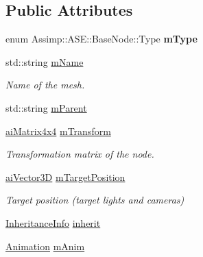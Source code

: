 \subsection*{Public Attributes}
\begin{DoxyCompactItemize}
\item 
\hypertarget{struct_assimp_1_1_a_s_e_1_1_base_node_acd7f2fd60c9259dc3c278f4c6e708300}{enum Assimp\+::\+A\+S\+E\+::\+Base\+Node\+::\+Type {\bfseries m\+Type}}\label{struct_assimp_1_1_a_s_e_1_1_base_node_acd7f2fd60c9259dc3c278f4c6e708300}

\item 
\hypertarget{struct_assimp_1_1_a_s_e_1_1_base_node_a1ee5b846983351d3dfc682df4fbc1807}{std\+::string \hyperlink{struct_assimp_1_1_a_s_e_1_1_base_node_a1ee5b846983351d3dfc682df4fbc1807}{m\+Name}}\label{struct_assimp_1_1_a_s_e_1_1_base_node_a1ee5b846983351d3dfc682df4fbc1807}

\begin{DoxyCompactList}\small\item\em Name of the mesh. \end{DoxyCompactList}\item 
std\+::string \hyperlink{struct_assimp_1_1_a_s_e_1_1_base_node_a65c3ff02a4f7a4f7548dbab107b0e026}{m\+Parent}
\item 
\hypertarget{struct_assimp_1_1_a_s_e_1_1_base_node_a84de0c31678f49a7242b25b2f0b3556c}{\hyperlink{structai_matrix4x4}{ai\+Matrix4x4} \hyperlink{struct_assimp_1_1_a_s_e_1_1_base_node_a84de0c31678f49a7242b25b2f0b3556c}{m\+Transform}}\label{struct_assimp_1_1_a_s_e_1_1_base_node_a84de0c31678f49a7242b25b2f0b3556c}

\begin{DoxyCompactList}\small\item\em Transformation matrix of the node. \end{DoxyCompactList}\item 
\hypertarget{struct_assimp_1_1_a_s_e_1_1_base_node_a8d6ca90c2c2a985a295cab16a6770ed6}{\hyperlink{structai_vector3_d}{ai\+Vector3\+D} \hyperlink{struct_assimp_1_1_a_s_e_1_1_base_node_a8d6ca90c2c2a985a295cab16a6770ed6}{m\+Target\+Position}}\label{struct_assimp_1_1_a_s_e_1_1_base_node_a8d6ca90c2c2a985a295cab16a6770ed6}

\begin{DoxyCompactList}\small\item\em Target position (target lights and cameras) \end{DoxyCompactList}\item 
\hyperlink{struct_assimp_1_1_a_s_e_1_1_inheritance_info}{Inheritance\+Info} \hyperlink{struct_assimp_1_1_a_s_e_1_1_base_node_a3ba9514175a7012d01f182d4150bf136}{inherit}
\item 
\hypertarget{struct_assimp_1_1_a_s_e_1_1_base_node_a7f1c087a6e0791a7b25c77c323e35611}{\hyperlink{struct_assimp_1_1_a_s_e_1_1_animation}{Animation} \hyperlink{struct_assimp_1_1_a_s_e_1_1_base_node_a7f1c087a6e0791a7b25c77c323e35611}{m\+Anim}}\label{struct_assimp_1_1_a_s_e_1_1_base_node_a7f1c087a6e0791a7b25c77c323e35611}


\end{DoxyCompactItemize}

